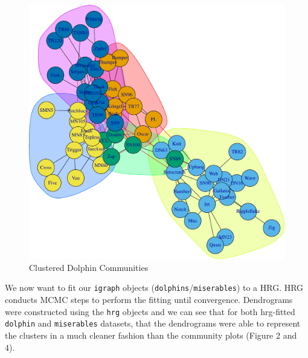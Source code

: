 \documentclass[]{article}
\newenvironment{Shaded}{\begin{snugshade}}{\end{snugshade}}
\newcommand{\KeywordTok}[1]{\textcolor[rgb]{0.13,0.29,0.53}{\textbf{{#1}}}}
\newcommand{\StringTok}[1]{\textcolor[rgb]{0.31,0.60,0.02}{{#1}}}
\newcommand{\CommentTok}[1]{\textcolor[rgb]{0.56,0.35,0.01}{\textit{{#1}}}}
\newcommand{\NormalTok}[1]{{#1}}
\begin{document}
\begin{Shaded}
\end{Shaded}

\begin{figure}

{\centering \includegraphics{sta546_hw3_files/figure-latex/unnamed-chunk-2-1} 

}

\caption{Clustered Dolphin Communities}\label{fig:unnamed-chunk-2}
\end{figure}

We now want to fit our \texttt{igraph} objects
(\texttt{dolphins}/\texttt{miserables}) to a HRG. HRG conducts MCMC
steps to perform the fitting until convergence. Dendrograms were
constructed using the \texttt{hrg} objects and we can see that for both
hrg-fitted \texttt{dolphin} and \texttt{miserables} datasets, that the
dendrograms were able to represent the clusters in a much cleaner
fashion than the community plots (Figure 2 and 4).
\end{document}
